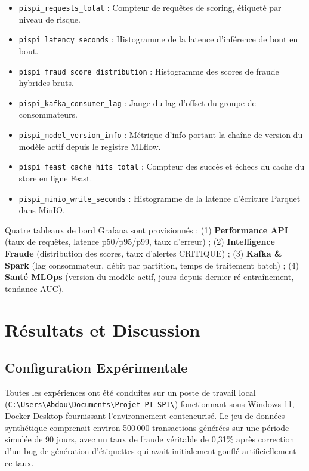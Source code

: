 \documentclass[12pt,a4paper,oneside]{book}
\theoremstyle{definition}
\theoremstyle{plain}
\begin{document}
\begin{itemize}
  \item \texttt{pispi\_requests\_total} : Compteur de requêtes de scoring, étiqueté par niveau de risque.
  \item \texttt{pispi\_latency\_seconds} : Histogramme de la latence d'inférence de bout en bout.
  \item \texttt{pispi\_fraud\_score\_distribution} : Histogramme des scores de fraude hybrides bruts.
  \item \texttt{pispi\_kafka\_consumer\_lag} : Jauge du lag d'offset du groupe de consommateurs.
  \item \texttt{pispi\_model\_version\_info} : Métrique d'info portant la chaîne de version du modèle actif depuis le registre MLflow.
  \item \texttt{pispi\_feast\_cache\_hits\_total} : Compteur des succès et échecs du cache du store en ligne Feast.
  \item \texttt{pispi\_minio\_write\_seconds} : Histogramme de la latence d'écriture Parquet dans MinIO.
\end{itemize}

Quatre tableaux de bord Grafana sont provisionnés : (1) \textbf{Performance API} (taux de requêtes, latence p50/p95/p99, taux d'erreur) ; (2) \textbf{Intelligence Fraude} (distribution des scores, taux d'alertes CRITIQUE) ; (3) \textbf{Kafka \& Spark} (lag consommateur, débit par partition, temps de traitement batch) ; (4) \textbf{Santé MLOps} (version du modèle actif, jours depuis dernier ré-entraînement, tendance AUC).

\chapter{Résultats et Discussion}
\label{chap:results}

\section{Configuration Expérimentale}

Toutes les expériences ont été conduites sur un poste de travail local (\texttt{C:\textbackslash Users\textbackslash Abdou\textbackslash Documents\textbackslash Projet PI-SPI\textbackslash}) fonctionnant sous Windows 11, Docker Desktop fournissant l'environnement conteneurisé. Le jeu de données synthétique comprenait environ 500\,000 transactions générées sur une période simulée de 90 jours, avec un taux de fraude véritable de 0,31\% après correction d'un bug de génération d'étiquettes qui avait initialement gonflé artificiellement ce taux.
\end{document}
